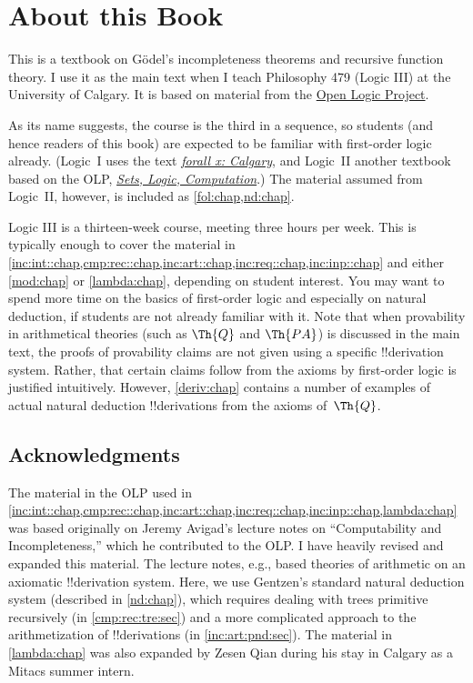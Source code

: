 
\chapter{About this Book}

This is a textbook on G\"odel's incompleteness theorems and recursive
function theory. I use it as the main text when I teach Philosophy 479
(Logic III) at the University of Calgary. It is based on material from the
\href{https://openlogicproject.org}{Open Logic Project}.

As its name suggests, the course is the third in a sequence, so
students (and hence readers of this book) are expected to be familiar
with first-order logic already.  (Logic~I uses the text
\href{https://forallx.openlogicproject.org}{\emph{forall x: Calgary}},
and Logic~II another textbook based on the OLP,
\href{https://slc.openlogicproject.org}{\emph{Sets, Logic,
Computation}}.) The material assumed from Logic~II, however, is
included as \cref{fol:chap,nd:chap}.

Logic III is a thirteen-week course, meeting three hours per week.
This is typically enough to cover the material in
\cref{inc:int::chap,cmp:rec::chap,inc:art::chap,inc:req::chap,inc:inp::chap}
and either \cref{mod:chap} or \cref{lambda:chap}, depending on student
interest. You may want to spend more time on the basics of
first-order logic and especially on natural deduction, if students are
not already familiar with it. Note that when provability in
arithmetical theories (such as $\Th{Q}$ and $\Th{PA}$) is discussed in
the main text, the proofs of provability claims are not given using a
specific !!{derivation} system. Rather, that certain claims follow from the
axioms by first-order logic is justified intuitively. However,
\cref{deriv:chap} contains a number of examples of actual natural
deduction !!{derivation}s from the axioms of~$\Th{Q}$.

\section*{Acknowledgments}

The material in the OLP used in
\cref{inc:int::chap,cmp:rec::chap,inc:art::chap,inc:req::chap,inc:inp::chap,lambda:chap}
was based originally on Jeremy Avigad's lecture notes on
``Computability and Incompleteness,'' which he contributed to the OLP.
I have heavily revised and expanded this material. The lecture notes,
e.g., based theories of arithmetic on an axiomatic !!{derivation} system. Here,
we use Gentzen's standard natural deduction system (described in
\cref{nd:chap}), which requires dealing with trees primitive
recursively (in \cref{cmp:rec:tre:sec}) and a more complicated
approach to the arithmetization of !!{derivation}s (in
\cref{inc:art:pnd:sec}). The material in \cref{lambda:chap} was also
expanded by Zesen Qian during his stay in Calgary as a Mitacs summer
intern.


